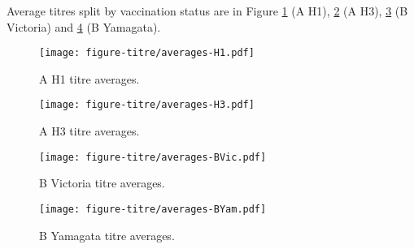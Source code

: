 \documentclass[12pt]{article}
\begin{document}
Average titres split by vaccination status are in Figure \ref{fig:titre-averages-H1} (A H1), \ref{fig:titre-averages-H3} (A H3), \ref{fig:titre-averages-BVic} (B Victoria) and \ref{fig:titre-averages-BYam} (B Yamagata).

\begin{figure}
	\texttt{[image: figure-titre/averages-H1.pdf]}
	\caption{A H1 titre averages.}
	\label{fig:titre-averages-H1}
\end{figure}

\begin{figure}
	\texttt{[image: figure-titre/averages-H3.pdf]}
	\caption{A H3 titre averages.}
	\label{fig:titre-averages-H3}
\end{figure}

\begin{figure}
	\texttt{[image: figure-titre/averages-BVic.pdf]}
	\caption{B Victoria titre averages.}
	\label{fig:titre-averages-BVic}
\end{figure}

\begin{figure}
	\texttt{[image: figure-titre/averages-BYam.pdf]}
	\caption{B Yamagata titre averages.}
	\label{fig:titre-averages-BYam}
\end{figure}
\end{document}
